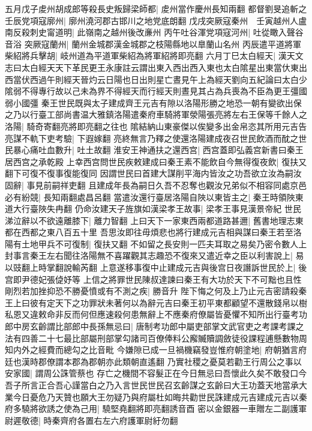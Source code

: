 五月戊子䖍州胡成郎等殺長史叛歸梁師都|{
	䖍州當作慶州長知兩翻}
都督劉旻追斬之　壬辰党項寇廓州|{
	廓州澆河郡古邯川之地党底朗翻}
戊戌突厥寇秦州　壬寅越州人盧南反殺刺史甯道明|{
	此嶺南之越州後改亷州}
丙午吐谷渾党項寇河州|{
	吐從瞰入聲谷音浴}
突厥寇蘭州|{
	蘭州金城郡漢金城郡之枝陽縣地以臯蘭山名州}
丙辰遣平道將軍柴紹將兵擊胡|{
	岐州道為平道軍柴紹為將軍紹將即亮翻}
六月丁巳太白經天|{
	漢天文志曰太白經天天下革民更王永康註云謂出東入西出西入東也太白隂星出東當㐲東出西當伏西過午則經天晉灼云日陽也日出則星亡晝見午上為經天劉向五紀論曰太白少隂弱不得專行故以己未為界不得經天而行經天則晝見其占為兵喪為不臣為更王彊國弱小國彊}
秦王世民既與太子建成齊王元吉有隙以洛陽形勝之地恐一朝有變欲出保之乃以行臺工部尚書温大雅鎮洛陽遣秦府車騎將軍滎陽張亮將左右王保等千餘人之洛陽|{
	騎奇寄翻亮將即亮翻之往也}
隂結納山東豪傑以俟變多出金帛恣其所用元吉告亮謀不軌下吏考驗|{
	下遐嫁翻}
亮終無言乃釋之使還洛陽建成夜召世民飲酒而酖之世民暴心痛吐血數升|{
	吐土故翻}
淮安王神通扶之還西宫|{
	西宫蓋即弘義宫新書曰秦王居西宫之承乾殿}
上幸西宫問世民疾敕建成曰秦王素不能飲自今無得復夜飲|{
	復扶又翻下可復不復事復能復同}
因謂世民曰首建大謀削平海内皆汝之功吾欲立汝為嗣汝固辭|{
	事見前嗣祥吏翻}
且建成年長為嗣日久吾不忍奪也觀汝兄弟似不相容同處京邑必有紛競|{
	長知兩翻處昌呂翻}
當遣汝還行臺居洛陽自陜以東皆主之|{
	秦王時領陜東道大行臺陜失冉翻}
仍命汝建天子旌旗如漢梁孝王故事|{
	梁孝王事見漢景帝紀}
世民涕泣辭以不欲遠離膝下|{
	離力智翻}
上曰天下一家東西兩都道路甚邇|{
	舊書地理志東都在西都之東八百五十里}
吾思汝即往毋煩悲也將行建成元吉相與謀曰秦王若至洛陽有土地甲兵不可復制|{
	復扶又翻}
不如留之長安則一匹夫耳取之易矣乃密令數人上封事言秦王左右聞往洛陽無不喜躍觀其志趣恐不復來又遣近幸之臣以利害說上|{
	易以豉翻上時掌翻說輸芮翻}
上意遂移事復中止建成元吉與後宫日夜譖訴世民於上|{
	後宫即尹德妃張偼妤等}
上信之將罪世民陳叔達諫曰秦王有大功於天下不可黜也且性剛烈若加挫抑恐不勝憂憤或有不測之疾|{
	勝音升}
陛下悔之何及上乃止元吉密請殺秦王上曰彼有定天下之功罪狀未著何以為辭元吉曰秦王初平東都顧望不還散錢帛以樹私恩又違敕命非反而何但應速殺何患無辭上不應秦府僚屬皆憂懼不知所出行臺考功郎中房玄齡謂比部郎中長孫無忌曰|{
	唐制考功郎中屬吏部掌文武官吏之考課考課之法有四善二十七最比部屬刑部掌勾諸司百僚俸料公廨贓贖調斂徒役課程逋懸數物周知内外之經費而總勾之比音毗}
今嫌隙已成一旦禍機竊發豈惟府朝塗地|{
	府朝猶言府廷也漢時郡僚謂本郡為郡朝亦此類朝直遙翻}
乃實社稷之憂莫若勸王行周公之事以安家國|{
	謂周公誅管蔡也}
存亡之機間不容髮正在今日無忌曰吾懷此久矣不敢發口今吾子所言正合吾心謹當白之乃入言世民世民召玄齡謀之玄齡曰大王功蓋天地當承大業今日憂危乃天贊也願大王勿疑乃與府屬杜如晦共勸世民誅建成元吉建成元吉以秦府多驍將欲誘之使為己用|{
	驍堅堯翻將即亮翻誘音酉}
密以金銀器一車贈左二副護軍尉遲敬德|{
	時秦齊府各置右左六府護軍尉紆勿翻}
